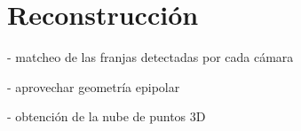 \section{Reconstrucción}
- matcheo de las franjas detectadas por cada cámara

- aprovechar geometría epipolar

- obtención de la nube de puntos 3D

\begin{figure}[!bth]
    \myfloatalign
        \\
        \\
\end{figure}
